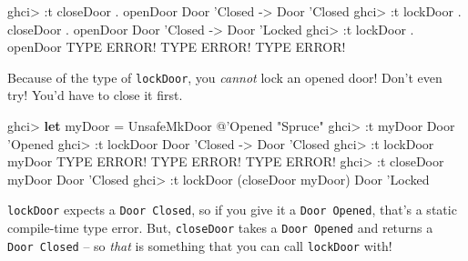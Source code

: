 \documentclass[]{article}
\newenvironment{Shaded}{\begin{snugshade}}{\end{snugshade}}
\newcommand{\CharTok}[1]{\textcolor[rgb]{0.31,0.60,0.02}{#1}}
\newcommand{\DataTypeTok}[1]{\textcolor[rgb]{0.13,0.29,0.53}{#1}}
\newcommand{\FunctionTok}[1]{\textcolor[rgb]{0.00,0.00,0.00}{#1}}
\newcommand{\KeywordTok}[1]{\textcolor[rgb]{0.13,0.29,0.53}{\textbf{#1}}}
\newcommand{\NormalTok}[1]{#1}
\begin{document}
\begin{Shaded}
\begin{Highlighting}[]
\NormalTok{ghci}\FunctionTok{>} \FunctionTok{:}\NormalTok{t closeDoor }\FunctionTok{.}\NormalTok{ openDoor}
\DataTypeTok{Door} \CharTok{'Closed -> Door '}\DataTypeTok{Closed}
\NormalTok{ghci}\FunctionTok{>} \FunctionTok{:}\NormalTok{t lockDoor }\FunctionTok{.}\NormalTok{ closeDoor }\FunctionTok{.}\NormalTok{ openDoor}
\DataTypeTok{Door} \CharTok{'Closed -> Door '}\DataTypeTok{Locked}
\NormalTok{ghci}\FunctionTok{>} \FunctionTok{:}\NormalTok{t lockDoor }\FunctionTok{.}\NormalTok{ openDoor}
\DataTypeTok{TYPE} \DataTypeTok{ERROR}\FunctionTok{!}  \DataTypeTok{TYPE} \DataTypeTok{ERROR}\FunctionTok{!}  \DataTypeTok{TYPE} \DataTypeTok{ERROR}\FunctionTok{!}
\end{Highlighting}
\end{Shaded}

Because of the type of \texttt{lockDoor}, you \emph{cannot} lock an opened door!
Don't even try! You'd have to close it first.

\begin{Shaded}
\begin{Highlighting}[]
\NormalTok{ghci}\FunctionTok{>} \KeywordTok{let}\NormalTok{ myDoor }\FunctionTok{=} \DataTypeTok{UnsafeMkDoor} \FunctionTok{@}\CharTok{'Opened "Spruce"}
\NormalTok{ghci}\FunctionTok{>} \FunctionTok{:}\NormalTok{t myDoor}
\DataTypeTok{Door} \CharTok{'Opened}
\NormalTok{ghci}\FunctionTok{>} \FunctionTok{:}\NormalTok{t lockDoor}
\DataTypeTok{Door} \CharTok{'Closed -> Door '}\DataTypeTok{Closed}
\NormalTok{ghci}\FunctionTok{>} \FunctionTok{:}\NormalTok{t lockDoor myDoor}
\DataTypeTok{TYPE} \DataTypeTok{ERROR}\FunctionTok{!}  \DataTypeTok{TYPE} \DataTypeTok{ERROR}\FunctionTok{!}  \DataTypeTok{TYPE} \DataTypeTok{ERROR}\FunctionTok{!}
\NormalTok{ghci}\FunctionTok{>} \FunctionTok{:}\NormalTok{t closeDoor myDoor}
\DataTypeTok{Door} \CharTok{'Closed}
\NormalTok{ghci}\FunctionTok{>} \FunctionTok{:}\NormalTok{t lockDoor (closeDoor myDoor)}
\DataTypeTok{Door} \CharTok{'Locked}
\end{Highlighting}
\end{Shaded}

\texttt{lockDoor} expects a \texttt{Door\ \textquotesingle{}Closed}, so if you
give it a \texttt{Door\ \textquotesingle{}Opened}, that's a static compile-time
type error. But, \texttt{closeDoor} takes a
\texttt{Door\ \textquotesingle{}Opened} and returns a
\texttt{Door\ \textquotesingle{}Closed} -- so \emph{that} is something that you
can call \texttt{lockDoor} with!
\end{document}
